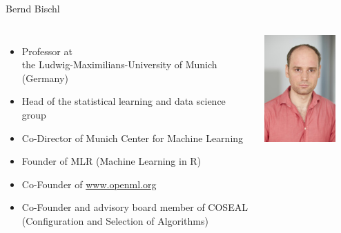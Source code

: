\begin{frame}[c]{Bernd Bischl}


\begin{columns}


	\begin{itemize}
		\item Professor at\\ the Ludwig-Maximilians-University of Munich (Germany)
		\item Head of the statistical learning and data science group
        \item Co-Director of Munich Center for Machine Learning
        \item Founder of MLR (Machine Learning in R)
		\item Co-Founder of \url{www.openml.org}
		\item Co-Founder and advisory board member of COSEAL\\ (Configuration and Selection of Algorithms)
	\end{itemize}


	\includegraphics[width=0.8\textwidth]{images/bischl.jpg}

\end{columns}

\end{frame}
